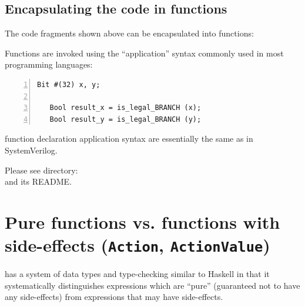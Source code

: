 

\subsection{Encapsulating the code in functions}

\label{BSV_functions_2}

The code fragments shown above can be encapsulated into {\BSV}
functions:



Functions are invoked using the ``application'' syntax commonly used
in most programming languages:

{\footnotesize
\begin{Verbatim}[frame=single, numbers=left]
   Bit #(32) x, y;

   Bool result_x = is_legal_BRANCH (x);
   Bool result_y = is_legal_BRANCH (y);
\end{Verbatim}
}

{\BSV} function declaration application syntax are essentially the
same as in SystemVerilog.

\Beginexercise

Please see directory:  \\
and its README.
\Endexercise


\section{Pure functions vs. functions with side-effects ({\tt Action}, {\tt ActionValue})}

\label{Sec_Pure_vs_Side_Effect_functions}


{\BSV} has a system of data types and type-checking similar to Haskell in
that it systematically distinguishes expressions which are ``pure''
(guaranteed not to have any side-effects) from expressions that may
have side-effects.

